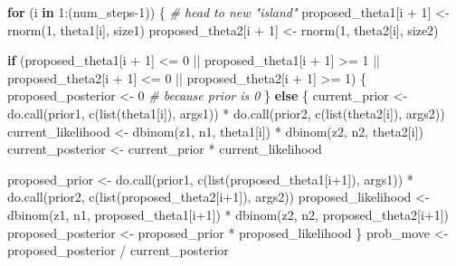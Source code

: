 \documentclass[
  12pt,
]{book}
\newenvironment{Shaded}{\begin{snugshade}}{\end{snugshade}}
\newcommand{\CommentTok}[1]{\textcolor[rgb]{0.56,0.35,0.01}{\textit{#1}}}
\newcommand{\ControlFlowTok}[1]{\textcolor[rgb]{0.13,0.29,0.53}{\textbf{#1}}}
\newcommand{\DecValTok}[1]{\textcolor[rgb]{0.00,0.00,0.81}{#1}}
\newcommand{\FunctionTok}[1]{\textcolor[rgb]{0.00,0.00,0.00}{#1}}
\newcommand{\NormalTok}[1]{#1}
\newcommand{\OtherTok}[1]{\textcolor[rgb]{0.56,0.35,0.01}{#1}}
\newcommand{\SpecialCharTok}[1]{\textcolor[rgb]{0.00,0.00,0.00}{#1}}
\theoremstyle{definition}
\theoremstyle{definition}
\theoremstyle{definition}
\theoremstyle{remark}
\begin{document}
\begin{Shaded}
\begin{Highlighting}[]
  \ControlFlowTok{for}\NormalTok{ (i }\ControlFlowTok{in} \DecValTok{1}\SpecialCharTok{:}\NormalTok{(num\_steps}\DecValTok{{-}1}\NormalTok{)) \{}
    \CommentTok{\# head to new "island"}
\NormalTok{    proposed\_theta1[i }\SpecialCharTok{+} \DecValTok{1}\NormalTok{] }\OtherTok{\textless{}{-}} \FunctionTok{rnorm}\NormalTok{(}\DecValTok{1}\NormalTok{, theta1[i], size1)}
\NormalTok{    proposed\_theta2[i }\SpecialCharTok{+} \DecValTok{1}\NormalTok{] }\OtherTok{\textless{}{-}} \FunctionTok{rnorm}\NormalTok{(}\DecValTok{1}\NormalTok{, theta2[i], size2)}
    
    \ControlFlowTok{if}\NormalTok{ (proposed\_theta1[i }\SpecialCharTok{+} \DecValTok{1}\NormalTok{] }\SpecialCharTok{\textless{}=} \DecValTok{0} \SpecialCharTok{||}
\NormalTok{        proposed\_theta1[i }\SpecialCharTok{+} \DecValTok{1}\NormalTok{] }\SpecialCharTok{\textgreater{}=} \DecValTok{1} \SpecialCharTok{||}
\NormalTok{        proposed\_theta2[i }\SpecialCharTok{+} \DecValTok{1}\NormalTok{] }\SpecialCharTok{\textless{}=} \DecValTok{0} \SpecialCharTok{||}
\NormalTok{        proposed\_theta2[i }\SpecialCharTok{+} \DecValTok{1}\NormalTok{] }\SpecialCharTok{\textgreater{}=} \DecValTok{1}\NormalTok{) \{}
\NormalTok{      proposed\_posterior }\OtherTok{\textless{}{-}} \DecValTok{0}  \CommentTok{\# because prior is 0}
\NormalTok{    \} }\ControlFlowTok{else}\NormalTok{ \{}
\NormalTok{      current\_prior }\OtherTok{\textless{}{-}} 
        \FunctionTok{do.call}\NormalTok{(prior1, }\FunctionTok{c}\NormalTok{(}\FunctionTok{list}\NormalTok{(theta1[i]), args1)) }\SpecialCharTok{*}
        \FunctionTok{do.call}\NormalTok{(prior2, }\FunctionTok{c}\NormalTok{(}\FunctionTok{list}\NormalTok{(theta2[i]), args2))}
\NormalTok{      current\_likelihood  }\OtherTok{\textless{}{-}} 
        \FunctionTok{dbinom}\NormalTok{(z1, n1, theta1[i]) }\SpecialCharTok{*}
        \FunctionTok{dbinom}\NormalTok{(z2, n2, theta2[i])}
\NormalTok{      current\_posterior   }\OtherTok{\textless{}{-}}\NormalTok{ current\_prior }\SpecialCharTok{*}\NormalTok{ current\_likelihood}
      
\NormalTok{      proposed\_prior }\OtherTok{\textless{}{-}} 
        \FunctionTok{do.call}\NormalTok{(prior1, }\FunctionTok{c}\NormalTok{(}\FunctionTok{list}\NormalTok{(proposed\_theta1[i}\SpecialCharTok{+}\DecValTok{1}\NormalTok{]), args1)) }\SpecialCharTok{*}
        \FunctionTok{do.call}\NormalTok{(prior2, }\FunctionTok{c}\NormalTok{(}\FunctionTok{list}\NormalTok{(proposed\_theta2[i}\SpecialCharTok{+}\DecValTok{1}\NormalTok{]), args2))}
\NormalTok{      proposed\_likelihood  }\OtherTok{\textless{}{-}} 
        \FunctionTok{dbinom}\NormalTok{(z1, n1, proposed\_theta1[i}\SpecialCharTok{+}\DecValTok{1}\NormalTok{]) }\SpecialCharTok{*}
        \FunctionTok{dbinom}\NormalTok{(z2, n2, proposed\_theta2[i}\SpecialCharTok{+}\DecValTok{1}\NormalTok{])}
\NormalTok{      proposed\_posterior   }\OtherTok{\textless{}{-}}\NormalTok{ proposed\_prior }\SpecialCharTok{*}\NormalTok{ proposed\_likelihood}
\NormalTok{    \}}
\NormalTok{    prob\_move           }\OtherTok{\textless{}{-}}\NormalTok{ proposed\_posterior }\SpecialCharTok{/}\NormalTok{ current\_posterior}
    

\end{Highlighting}
\end{Shaded}
\end{document}
